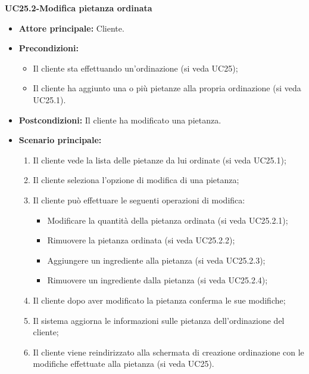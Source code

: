 \textbf{UC25.2-Modifica pietanza ordinata}
\begin{itemize}
\item \textbf{Attore principale:} Cliente.
\item \textbf{Precondizioni:} 
\begin{itemize}
    \item Il cliente sta effettuando un'ordinazione (si veda UC25);
    \item Il cliente ha aggiunto una o più pietanze alla propria ordinazione (si veda UC25.1).
\end{itemize}
\item \textbf{Postcondizioni:} Il cliente ha modificato una pietanza.
\item \textbf{Scenario principale:}
\begin{enumerate}
    \item Il cliente vede la lista delle pietanze da lui ordinate (si veda UC25.1);
    \item Il cliente seleziona l'opzione di modifica di una pietanza;
    \item Il cliente può effettuare le seguenti operazioni di modifica:
    \begin{itemize}
        \item Modificare la quantità della pietanza ordinata (si veda UC25.2.1);
        \item Rimuovere la pietanza ordinata (si veda UC25.2.2);
        \item Aggiungere un ingrediente alla pietanza (si veda UC25.2.3);
        \item Rimuovere un ingrediente dalla pietanza (si veda UC25.2.4);
    \end{itemize}
    \item Il cliente dopo aver modificato la pietanza conferma le sue modifiche;
    \item Il sistema aggiorna le informazioni sulle pietanza dell'ordinazione del cliente;
    \item Il cliente viene reindirizzato alla schermata di creazione ordinazione con le modifiche effettuate alla pietanza (si veda UC25).
\end{enumerate}
\end{itemize}

